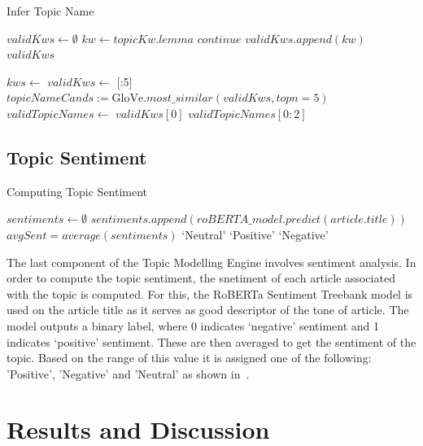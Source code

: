 \begin{algorithm}[H]
  \caption{Infer Topic Name}
  \label{alg:topic_name}
  \begin{algorithmic}   
    \State $validKws \gets \emptyset$
    \State $kw \gets topicKw.lemma$
    \State $continue$
    \EndIf
    \State $validKws.append(kw)$
    \EndFor
    \State \Return $validKws$
  \EndFunction

\vspace{1em}
    \State $kws \gets$ 
    \State $validKws \gets$ [:5]
    \State $topicNameCands := \text{GloVe}.most\_similar(validKws, topn=5)$
    \State $validTopicNames \gets$ 
    \State \Return $validKws[0]$
    \Else
    \State \Return $validTopicNames[0:2]$
    \EndIf
  \EndFunction
\end{algorithmic}
\end{algorithm}
\vspace{-1ex}
\subsection*{Topic Sentiment}

\begin{algorithm}[H]
  \caption{Computing Topic Sentiment}
  \label{alg:topic_sent}
  \begin{algorithmic}   
    \State $sentiments \gets  \emptyset$
    \State $sentiments.append(roBERTA\_model.predict(article.title))$ 
    \EndFor
    \State $avgSent = average(sentiments)$
    \State \Return `Neutral'
      \Return `Positive'
    \Else  \Return `Negative'\EndIf
  \EndFunction
\end{algorithmic}
\end{algorithm}
\vspace{-1ex}
The last component of the Topic Modelling Engine involves sentiment analysis. In order to compute the topic sentiment, the snetiment of each article associated with the topic is computed. For this, the RoBERTa Sentiment Treebank model is used on the article title as it serves as good descriptor of the tone of article. The model outputs a binary label, where 0 indicates `negative' sentiment and 1 indicates `positive' sentiment. These are then averaged to get the sentiment of the topic. Based on the range of this value it is assigned one of the following: 'Positive', 'Negative' and 'Neutral' as shown in~.

\section{Results and Discussion}
